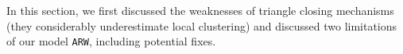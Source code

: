 In this section, we first discussed the weaknesses of triangle closing mechanisms (they considerably underestimate local clustering) and discussed two limitations of our model \texttt{ARW}, including potential fixes.
%

%
%

